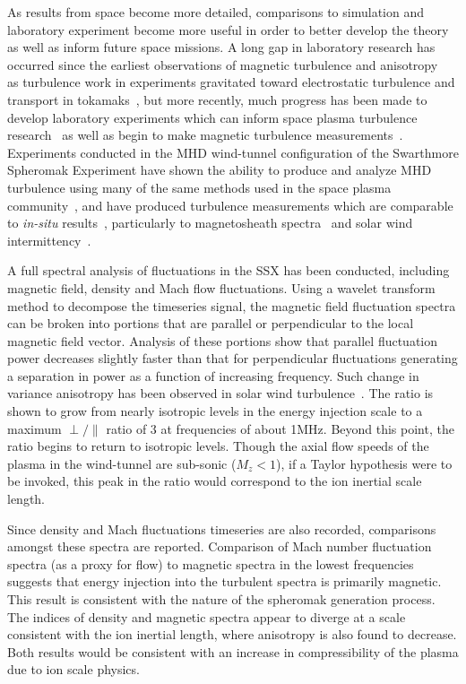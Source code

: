 \documentclass[aip,prl,amsmath,amssymb,reprint,superscriptaddress]{revtex4-1} %
\begin{document}
As results from space become more detailed, comparisons to simulation and laboratory experiment become more useful in order to better develop the theory as well as inform future space missions. A long gap in laboratory research has occurred since the earliest observations of magnetic turbulence and anisotropy~\cite{robinson71} as turbulence work in experiments gravitated toward electrostatic turbulence and transport in tokamaks~\cite{liewer85,tynan09}, but more recently, much progress has been made to develop laboratory experiments which can inform space plasma turbulence research~\cite{howes12a} as well as begin to make magnetic turbulence measurements~\cite{ren11}. Experiments conducted in the MHD wind-tunnel configuration of the Swarthmore Spheromak Experiment have shown the ability to produce and analyze MHD turbulence using many of the same methods used in the space plasma community~\cite{deWit13}, and have produced turbulence measurements which are comparable to \textit{in-situ} results~\cite{schaffner14a,schaffner14b}, particularly to magnetosheath spectra~\cite{yordanova08} and solar wind intermittency~\cite{sorrisovalvo99}.

A full spectral analysis of fluctuations in the SSX has been conducted, including magnetic field, density and Mach flow fluctuations. Using a wavelet transform method to decompose the timeseries signal, the magnetic field fluctuation spectra can be broken into portions that are parallel or perpendicular to the local magnetic field vector. Analysis of these portions show that parallel fluctuation power decreases slightly faster than that for perpendicular fluctuations generating a separation in power as a function of increasing frequency. Such change in variance anisotropy has been observed in solar wind turbulence~\cite{kiyani13}. The ratio is shown to grow from nearly isotropic levels in the energy injection scale to a maximum $\perp/\parallel$ ratio of 3 at frequencies of about 1MHz. Beyond this point, the ratio begins to return to isotropic levels. Though the axial flow speeds of the plasma in the wind-tunnel are sub-sonic ($M_{z} < 1$), if a Taylor hypothesis were to be invoked, this peak in the ratio would correspond to the ion inertial scale length. 

Since density and Mach fluctuations timeseries are also recorded, comparisons amongst these spectra are reported. Comparison of Mach number fluctuation spectra (as a proxy for flow) to magnetic spectra in the lowest frequencies suggests that energy injection into the turbulent spectra is primarily magnetic. This result is consistent with the nature of the spheromak generation process. The indices of density and magnetic spectra appear to diverge at a scale consistent with the ion inertial length, where anisotropy is also found to decrease. Both results would be consistent with an increase in compressibility of the plasma due to ion scale physics.
\end{document}
